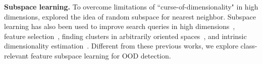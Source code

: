 \vspace{0.1cm}
\noindent\textbf{Subspace learning.} To overcome limitations of ``curse-of-dimensionality" in high dimensions, \citet{ho1998nearest} explored the idea of random subspace
for nearest neighbor. Subspace learning has also been used to improve search queries in high dimensions~\cite{hund2015subspace}, feature selection~\cite{liu2007computational}, finding clusters in arbitrarily oriented spaces~\cite{kriegel2009clustering}, and intrinsic dimensionality estimation~\cite{houle2014efficient}.  Different from these previous works, we explore class-relevant feature subspace learning for OOD detection.



